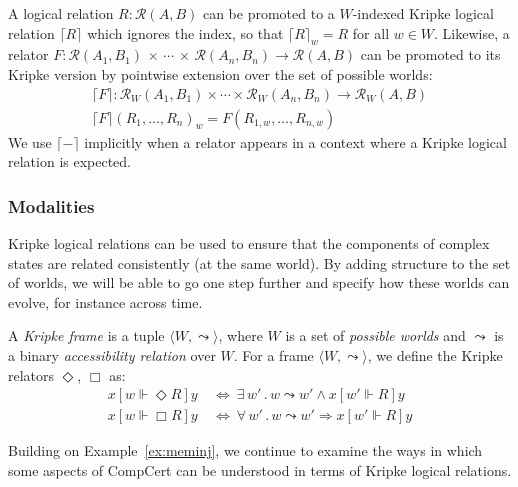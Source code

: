 \documentclass[sigplan,10pt,review,anonymous]{acmart}
\newcommand{\ifr}[1]{\mathrel{[{#1}]}}
\begin{document}
A logical relation $R : \mathcal{R}(A, B)$
can be promoted to a $W$-indexed Kripke logical relation $\lceil R \rceil$
which ignores the index, so that $\lceil R \rceil_w = R$ for all $w \in W$.
Likewise,
a relator
  $F : \mathcal{R}(A_1, B_1) \,\times\,\cdots\,\times\,\mathcal{R}(A_n, B_n) \rightarrow \mathcal{R}(A, B)$
can be promoted to its Kripke version
by pointwise extension over the set of possible worlds:
\begin{gather*}
  \lceil F \rceil : \mathcal{R}_W(A_1, B_1) \times \cdots \times \mathcal{R}_W(A_n, B_n) \rightarrow \mathcal{R}_W(A, B) \\
  \lceil F \rceil (R_1, \ldots, R_n)_w = F(R_{1,w}, \ldots, R_{n,w})
\end{gather*}
We use $\lceil - \rceil$ implicitly
when a relator appears in a context where
a Kripke logical relation is expected.

\subsubsection{Modalities}

Kripke logical relations
can be used to ensure that the components of complex states
are related consistently (at the same world).
By adding structure to the set of worlds,
we will be able to go one step further and
specify how these worlds can evolve,
for instance across time.

\begin{definition} %
A \emph{Kripke frame} is a tuple
$\langle W, {\leadsto} \rangle$, where
$W$ is a set of \emph{possible worlds} and
$\leadsto$ is a
binary \emph{accessibility relation} over $W$.
For a frame
$\langle W, \leadsto \rangle$,
we define the Kripke relators $\Diamond$, $\Box$ as:
\begin{align*}
  x \ifr{w \Vdash \Diamond R} y & \: \Leftrightarrow \:
    \exists \, w' \,.\, w \leadsto w' \wedge
      x \ifr{w' \Vdash R} y \\
  x \ifr{w \Vdash \Box R} y & \: \Leftrightarrow \:
    \forall \, w' \,.\, w \leadsto w' \Rightarrow
      x \ifr{w' \Vdash R} y
\end{align*}
\end{definition}

Building on Example~\ref{ex:meminj},
we continue to examine the ways in which
some aspects of CompCert can be understood
in terms of Kripke logical relations.
\end{document}
